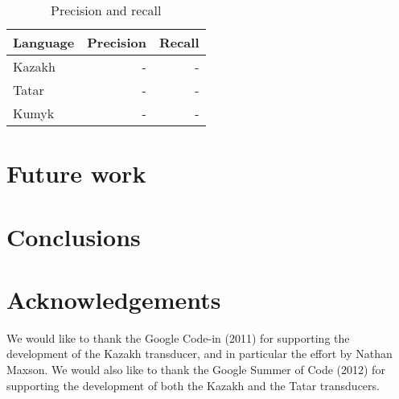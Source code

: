 \documentclass[a4paper,11pt,twocolumn]{article}
\begin{document}
\begin{table}
\begin{center}
\begin{tabular}{lrr}
\textbf{Language} & \textbf{Precision} & \textbf{Recall} \\
\hline
Kazakh & - &  - \\
Tatar & - & - \\
Kumyk & - & - \\
\hline
\end{tabular}
 \caption{Precision and recall}
 \label{table:coverage}
\end{center}
\end{table}



\section{Future work}


\section{Conclusions}

\section*{Acknowledgements}

We would like to thank the Google Code-in (2011) for supporting the development 
of the Kazakh transducer, and in particular the effort by Nathan Maxson. We 
would also like to thank the Google Summer of Code (2012) for supporting the 
development of both the Kazakh and the Tatar transducers. 



\end{document}
